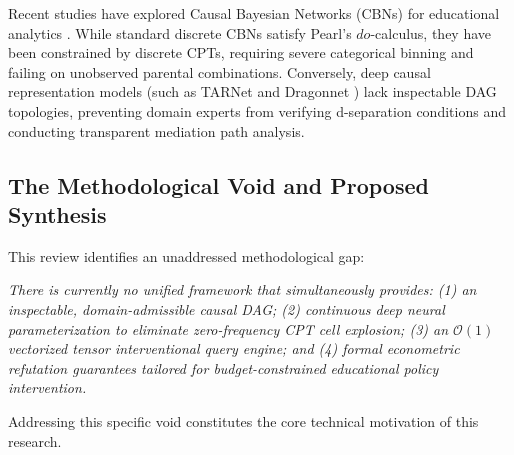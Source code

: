 Recent studies have explored Causal Bayesian Networks (CBNs) for educational analytics \parencite{edm2024cbn}. While standard discrete CBNs satisfy Pearl's $do$-calculus, they have been constrained by discrete CPTs, requiring severe categorical binning and failing on unobserved parental combinations. Conversely, deep causal representation models (such as TARNet \parencite{shalit2017tarnet} and Dragonnet \parencite{shi2019dragonnet}) lack inspectable DAG topologies, preventing domain experts from verifying d-separation conditions and conducting transparent mediation path analysis.

\subsection{The Methodological Void and Proposed Synthesis}

This review identifies an unaddressed methodological gap:
\begin{displayquote}
\textit{There is currently no unified framework that simultaneously provides: (1) an inspectable, domain-admissible causal DAG; (2) continuous deep neural parameterization to eliminate zero-frequency CPT cell explosion; (3) an $\mathcal{O}(1)$ vectorized tensor interventional query engine; and (4) formal econometric refutation guarantees tailored for budget-constrained educational policy intervention.}
\end{displayquote}
Addressing this specific void constitutes the core technical motivation of this research.
